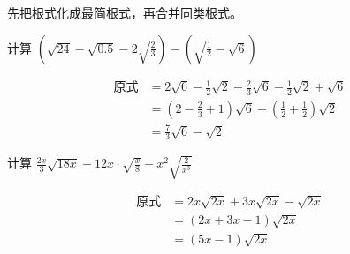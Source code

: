 先把根式化成最简根式，再合并同类根式。

\begin{example}
    计算 $\left(\sqrt{24}-\sqrt{0.5}-2 \sqrt{\frac{2}{3}}\right)-\left(\sqrt{\frac{1}{2}}-\sqrt{6}\right)$
\end{example}

\begin{solution}
    \[\begin{split}
 \text{原式}&= 2 \sqrt{6}-\frac{1}{2} \sqrt{2}-\frac{2}{3} \sqrt{6} -\frac{1}{2} \sqrt{2}+\sqrt{6} \\
 &=\left(2-\frac{2}{3}+1\right) \sqrt{6}-\left(\frac{1}{2}+\frac{1}{2}\right) \sqrt{2} \\
 &=\frac{7}{3} \sqrt{6}-\sqrt{2}     
    \end{split}\]
\end{solution}


\begin{example}
计算 $\frac{2 x}{3} \sqrt{18 x}+12 x \cdot \sqrt{\frac{x}{8}}-x^{2} \sqrt{\frac{2}{x^{3}}}$
\end{example}    

\begin{solution}
    \[\begin{split}
 \text{原式}&=2 x \sqrt{2 x}+3 x \sqrt{2 x}-\sqrt{2 x} \\
 &=(2 x+3 x-1) \sqrt{2 x}\\
 &=(5 x-1) \sqrt{2 x}    
    \end{split}\]
\end{solution}


